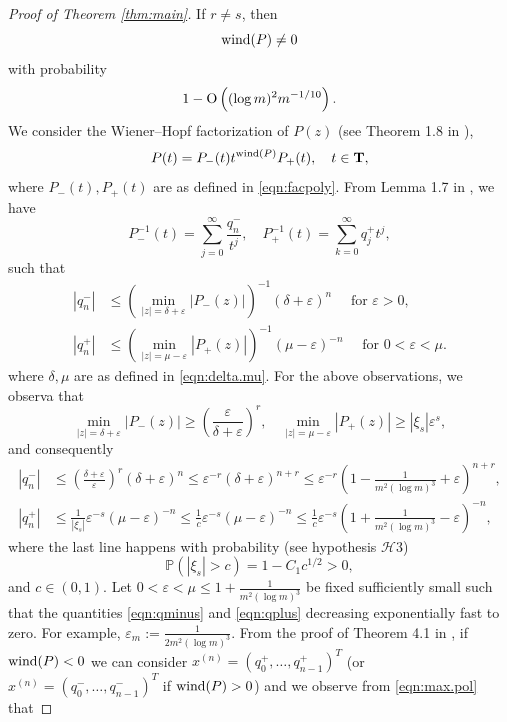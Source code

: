 \documentclass[12pt]{amsart}
\theoremstyle{plain}
\numberwithin{equation}{section}
\renewcommand{\Pr}{\mathbb{P}}
\newcommand{\<}{\langle}
\renewcommand{\>}{\rangle}
\newcommand{\PP}[1]{\left(#1\right)}
\newcommand{\abs}[1]{\left|#1\right|}
\renewcommand{\Pr}[1]{\mathds{P}\left(#1\right)}
\begin{document}
\begin{proof}[Proof of Theorem \ref{thm:main}]
If $r\neq s$, then 
\[
\textnormal{wind}(P) \neq 0
\]
with probability
\[
1-\textnormal{O}\PP{ {(\log m)^2}{m^{-1/10}} }.
\]
We consider the Wiener--Hopf factorization of $P(z)$ (see Theorem 1.8 in \cite{bottcher2005spectral}),
\[
P(t) = P_{-}(t) t^{\textnormal{wind}(P)} P_{+}(t), \quad t\in\mathbf{T},
\]
where $P_{-}(t), P_{+}(t)$ are as defined in \ref{eqn:facpoly}. From Lemma 1.7 in \cite{bottcher2005spectral}, we have 
\[
P_{-}^{-1}(t) = \sum_{j=0}^{\infty} \frac{q_n^{-}}{t^j}, \quad P_{+}^{-1}(t) = \sum_{k=0}^{\infty} q^{+}_j t^j,
\]
such that
\begin{align*}
\abs{q^{-}_{n}} & \leq \PP{ \min_{\abs{z}=\delta+\varepsilon} \abs{P_{-}(z)} }^{-1} \PP{\delta+\varepsilon}^n \quad \mbox{ for $\varepsilon > 0$}, \\
\abs{q^{+}_{n}} & \leq \PP{ \min_{\abs{z}=\mu-\varepsilon} \abs{P_{+}(z)} }^{-1} \PP{\mu - \varepsilon}^{-n} \quad \mbox{ for $0< \varepsilon < \mu$}.
\end{align*}
where $\delta, \mu$ are as defined in \ref{eqn:delta.mu}. For the above observations, we observa that
\[ 
\min_{\abs{z}=\delta+\varepsilon} \abs{P_{-}(z)} \geq \PP{ \frac{\varepsilon}{\delta + \varepsilon} }^{r}, \quad \min_{\abs{z}=\mu-\varepsilon} \abs{P_{+}(z)} \geq \abs{\xi_s} {\varepsilon}^{s},
\]
and consequently
\begin{align}
\abs{q^{-}_{n}} & \leq \PP{ \frac{\delta + \varepsilon}{\varepsilon} }^{r} \PP{\delta + \varepsilon}^{n} \leq \varepsilon^{-r} \PP{\delta + \varepsilon}^{n+r} \leq \varepsilon^{-r} \PP{1 - \frac{1}{m^2 (\log m)^3} + \varepsilon}^{n+r} , \label{eqn:qminus}\\
\abs{q^{+}_{n}} & \leq \frac{1}{\abs{\xi_s}} \varepsilon^{-s} \PP{\mu - \varepsilon}^{-n} \leq \frac{1}{c}\varepsilon^{-s} \PP{\mu - \varepsilon}^{-n} \leq \frac{1}{c} \varepsilon^{-s} \PP{1 + \frac{1}{m^2 (\log m)^{3}} - \varepsilon}^{-n}, \label{eqn:qplus}
\end{align}
where the last line happens with probability (see hypothesis $\mathcal{H}3$)
\[
\Pr{\abs{\xi_s} > c } = 1 - C_1 c^{1/2} > 0,
\]
and $c\in(0,1)$.
Let $0 < \varepsilon < \mu\leq 1 + \frac{1}{m^2(\log m)^3}$ be fixed sufficiently small such that the quantities \ref{eqn:qminus} and \ref{eqn:qplus} decreasing exponentially fast to zero. For example, $\varepsilon_m := \frac{1}{2m^2(\log m)^3}$. From the proof of Theorem 4.1 in \cite{bottcher2005spectral}, if $\textnormal{wind}(P) < 0 $ we can consider $x^{(n)}=(q^{+}_{0},\ldots,q^{+}_{n-1})^{T}$ (or $x^{(n)}=(q^{-}_{0},\ldots,q^{-}_{n-1})^{T}$ if $\textnormal{wind}(P)>0$) and we observe from \ref{eqn:max.pol} that

\end{proof}
\end{document}
